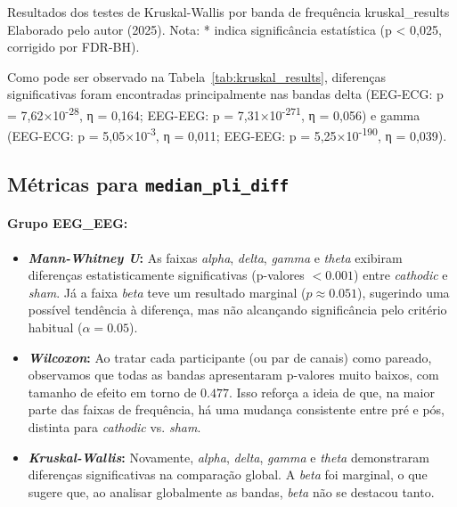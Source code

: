 {Resultados dos testes de Kruskal-Wallis por banda de frequência}
{kruskal_results}
{Elaborado pelo autor (2025). Nota: * indica significância estatística (p < 0,025, corrigido por FDR-BH).}

Como pode ser observado na Tabela~\ref{tab:kruskal_results}, diferenças significativas foram encontradas principalmente nas bandas delta (EEG-ECG: p = 7,62×10\textsuperscript{-28}, η = 0,164; EEG-EEG: p = 7,31×10\textsuperscript{-271}, η = 0,056) e gamma (EEG-ECG: p = 5,05×10\textsuperscript{-3}, η = 0,011; EEG-EEG: p = 5,25×10\textsuperscript{-190}, η = 0,039).

\subsection{Métricas para \texttt{median\_pli\_diff}}

\paragraph{Grupo EEG\_EEG:}
\begin{itemize}
    \item \textbf{\textit{Mann-Whitney U}:} As faixas \emph{alpha}, \emph{delta}, \emph{gamma} e \emph{theta} exibiram diferenças estatisticamente significativas (p-valores $< 0.001$) entre \emph{cathodic} e \textit{sham}. Já a faixa \emph{beta} teve um resultado marginal ($p \approx 0.051$), sugerindo uma possível tendência à diferença, mas não alcançando significância pelo critério habitual ($\alpha=0.05$).
    \item \textbf{\textit{Wilcoxon}:} Ao tratar cada participante (ou par de canais) como pareado, observamos que todas as bandas apresentaram p-valores muito baixos, com tamanho de efeito em torno de $0.477$. Isso reforça a ideia de que, na maior parte das faixas de frequência, há uma mudança consistente entre pré e pós, distinta para \textit{cathodic} vs. \textit{sham}.
    \item \textbf{\textit{Kruskal-Wallis}:} Novamente, \emph{alpha}, \emph{delta}, \emph{gamma} e \emph{theta} demonstraram diferenças significativas na comparação global. A \emph{beta} foi marginal, o que sugere que, ao analisar globalmente as bandas, \emph{beta} não se destacou tanto.
\end{itemize}

